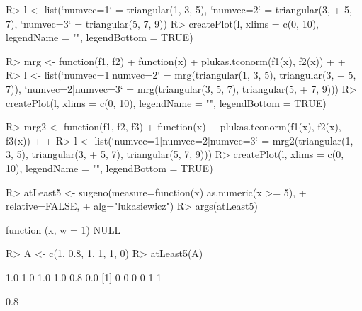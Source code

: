 \documentclass{article}\usepackage[]{graphicx}\usepackage[]{color}
\begin{document}
\begin{Schunk}
\begin{Sinput}
R> l <- list(`numvec=1` = triangular(1, 3, 5), `numvec=2` = triangular(3, 
+      5, 7), `numvec=3` = triangular(5, 7, 9))
R> createPlot(l, xlims = c(0, 10), legendName = "", legendBottom = TRUE)
\end{Sinput}
\end{Schunk}

\begin{Schunk}
\begin{Sinput}
R> mrg <- function(f1, f2) {
+      function(x) {
+          plukas.tconorm(f1(x), f2(x))
+      }
+  }
R> l <- list(`numvec=1|numvec=2` = mrg(triangular(1, 3, 5), triangular(3, 
+      5, 7)), `numvec=2|numvec=3` = mrg(triangular(3, 5, 7), triangular(5, 
+      7, 9)))
R> createPlot(l, xlims = c(0, 10), legendName = "", legendBottom = TRUE)
\end{Sinput}
\end{Schunk}

\begin{Schunk}
\begin{Sinput}
R> mrg2 <- function(f1, f2, f3) {
+      function(x) {
+          plukas.tconorm(f1(x), f2(x), f3(x))
+      }
+  }
R> l <- list(`numvec=1|numvec=2|numvec=3` = mrg2(triangular(1, 3, 5), triangular(3, 
+      5, 7), triangular(5, 7, 9)))
R> createPlot(l, xlims = c(0, 10), legendName = "", legendBottom = TRUE)
\end{Sinput}
\end{Schunk}

\begin{Schunk}
% --begin: "quant1"
\begin{Sinput}
R> atLeast5 <- sugeno(measure=function(x) as.numeric(x >= 5),
+                     relative=FALSE,
+                     alg="lukasiewicz")
R> args(atLeast5)
\end{Sinput}
\begin{Soutput}
function (x, w = 1) 
NULL
\end{Soutput}
%
% --end: "quant1"
\end{Schunk}

\begin{Schunk}
% --begin: "quant2"
\begin{Sinput}
R> A <- c(1, 0.8, 1, 1, 1, 0)
R> atLeast5(A)
\end{Sinput}
\begin{Soutput}
[1] 1.0 1.0 1.0 1.0 0.8 0.0
[1] 0 0 0 0 1 1
\end{Soutput}
\begin{Soutput}
[1] 0.8
\end{Soutput}
%
% --end: "quant2"
\end{Schunk}
\end{document}
